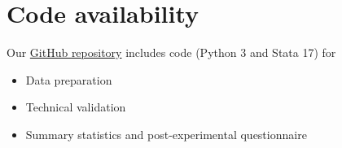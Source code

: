 \documentclass[fleqn,10pt]{wlscirep}
\begin{document}


\section*{Code availability}

Our \href{https://github.com/mit-econ-ai/radiology_ai_data}{GitHub repository} includes code (Python 3 and Stata 17) for

\begin{itemize}
    \item Data preparation
    \item Technical validation
    \item Summary statistics and post-experimental questionnaire
\end{itemize}


\nocite{*}



\end{document}
